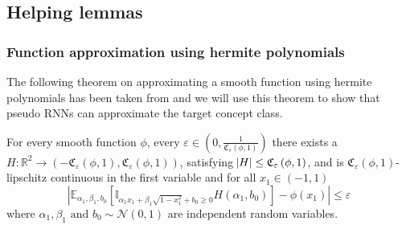 





























\subsection{Helping lemmas}
\subsubsection{Function approximation using hermite polynomials}
The following theorem on approximating a smooth function using hermite polynomials has been taken from \cite{allen2019learning} and we will use this theorem to show that pseudo RNNs can approximate the target concept class.
\begin{theorem}\label{Thm:Smooth_H}
	For every smooth function $\phi$, every $\varepsilon \in \left(0, \frac{1}{\mathfrak{C}_{s}\left(\phi, 1\right)}\right)$ there exists a $H:\mathbb{R}^2 \to \left(-\mathfrak{C}_\varepsilon\left(\phi, 1\right), \mathfrak{C}_\varepsilon\left(\phi, 1\right)\right)$, satisfying $\abs{H} \le \mathfrak{C}_\varepsilon\left(\phi, 1\right)$, and is $\mathfrak{C}_\varepsilon\left(\phi, 1\right)$-lipschitz continuous in the first variable and for all $x_1 \in (-1, 1)$
	\begin{equation*}
		\left|\mathbb{E}_{\alpha_1, \beta_1, b_0}\left[\mathbb{I}_{\alpha_{1} x_{1}+\beta_{1} \sqrt{1-x_{1}^{2}} + b_0   \geq 0} {H\left(\alpha_{1}, b_0\right)}\right]-\phi\left(x_{1}\right)\right| \leq \varepsilon
	\end{equation*}
	where $\alpha_1, \beta_1\text{ and } b_0 \sim \mathcal{N}\left(0, 1\right)$ are independent random variables.
\end{theorem}

